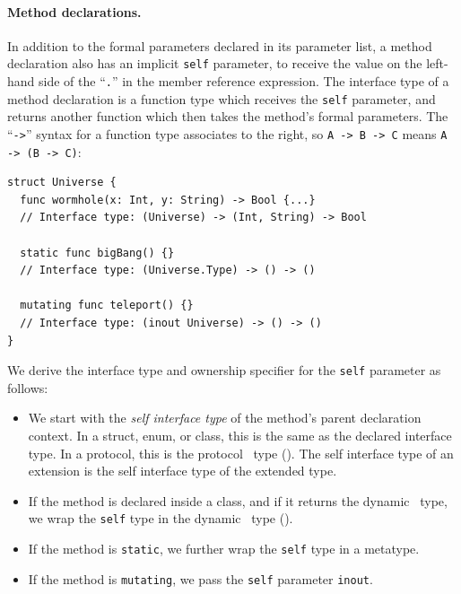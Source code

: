 \documentclass[../generics]{subfiles}
\begin{document}
\paragraph{Method declarations.}
In addition to the formal parameters declared in its parameter list, a method declaration also has an implicit \texttt{self} parameter, to receive the value on the left-hand side of the ``\texttt{.}'' in the member reference expression. The interface type of a method declaration is a function type which receives the \texttt{self} parameter, and returns another function which then takes the method's formal parameters. The ``\texttt{->}'' syntax for a function type associates to the right, so \verb|A -> B -> C| means \verb|A -> (B -> C)|:
\begin{Verbatim}
struct Universe {
  func wormhole(x: Int, y: String) -> Bool {...}
  // Interface type: (Universe) -> (Int, String) -> Bool

  static func bigBang() {}
  // Interface type: (Universe.Type) -> () -> ()

  mutating func teleport() {}
  // Interface type: (inout Universe) -> () -> ()
}
\end{Verbatim}
We derive the interface type and ownership specifier for the \texttt{self} parameter as follows:
\begin{itemize}
\item We start with the \emph{self interface type} of the method's parent declaration context. In a struct, enum, or class, this is the same as the declared interface type. In a protocol, this is the protocol \IndexSelf\tSelf\ type (). The self interface type of an extension is the self interface type of the extended type.

\item If the method is declared inside a class, and if it returns the dynamic \tSelf\ type, we wrap the \texttt{self} type in the dynamic \tSelf\ type ().

\item If the method is \texttt{static}, we further wrap the \texttt{self} type in a metatype.

\item If the method is \texttt{mutating}, we pass the \texttt{self} parameter \texttt{inout}.

\end{itemize}
\end{document}
